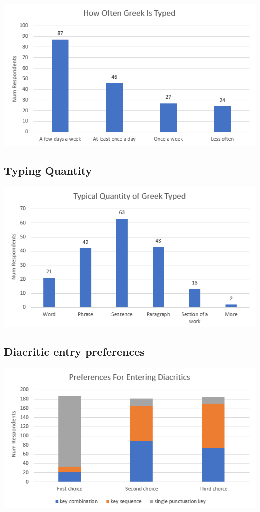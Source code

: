 \documentclass[11pt]{article}
\begin{document}
\begin{center}
\includegraphics[width=.9\linewidth]{./images/typing-frequency.PNG}
\end{center}

\subsection{Typing Quantity}
\label{sec:org51f34a0}

\begin{center}
\includegraphics[width=.9\linewidth]{./images/typing-quantity.PNG}
\end{center}

\subsection{Diacritic entry preferences}
\label{sec:org33cec4f}

\begin{center}
\includegraphics[width=.9\linewidth]{./images/diacritic-entry-preferences.PNG}
\end{center}
\end{document}
